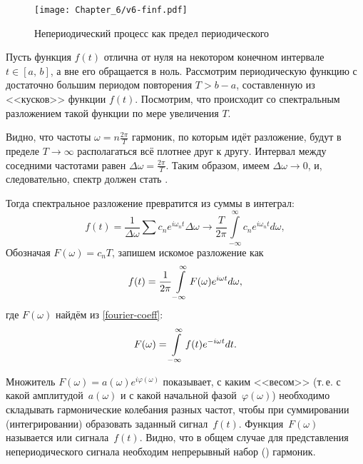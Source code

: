 \begin{wrapfigure}[9]{o}{0.5\textwidth}
    \centering\texttt{[image: Chapter\_6/v6-finf.pdf]}
    \caption{Непериодический процесс как предел периодического}
\end{wrapfigure}

Пусть функция $f(t)$ отлична от нуля на некотором конечном интервале
$t\in[a,\,b]$, а вне его обращается в ноль. Рассмотрим периодическую функцию
с достаточно большим периодом повторения $T>b-a$, составленную из <<кусков>>
функции $f(t)$. Посмотрим, что происходит со спектральным разложением
такой функции по мере увеличения $T$.

Видно, что частоты $\omega = n \frac{2\pi}{T}$ гармоник, по которым идёт
разложение, будут в пределе $T\to \infty$ располагаться всё плотнее друг к другу.
Интервал между соседними частотами равен $\Delta \omega = \frac{2\pi}{T}$.
Таким образом, имеем $\Delta \omega\to 0$, и, следовательно,
спектр должен стать .

Тогда спектральное разложение превратится из суммы в интеграл:
\begin{equation*}
 f(t) = \frac{1}{\Delta \omega}\sum c_n e^{i\omega_n t} \Delta \omega \to
 \frac{T}{2\pi} \int\limits_{-\infty}^{\infty} c_n e^{i\omega_n t} d\omega,
\end{equation*}
Обозначая $F(\omega)=c_n T$, запишем искомое разложение как
\begin{equation}
\eqmark{Fourier integral}
f(t) = \frac{1}{2\pi} \int\limits_{-\infty}^{\infty} F(\omega) e^{i\omega t} d\omega,
\end{equation}
где $F(\omega)$ найдём из \eqref{fourier-coeff}:
\begin{equation}
\eqmark{Fourier integral-coef}
 F(\omega) =
\int\limits_{-\infty}^{\infty} f(t) e^{-i\omega t} dt.
\end{equation}

Множитель $F(\omega)=a(\omega)e^{i\varphi(\omega)}$ показывает, с каким
<<весом>> (т.\,е. с какой амплитудой~$a(\omega)$ и с какой начальной 
фазой~$\varphi(\omega)$) необходимо складывать гармонические
колебания разных частот, чтобы при суммировании (интегрировании) образовать
заданный сигнал~$f(t)$. Функция~$F(\omega)$ называется 
или  сигнала~$f(t)$.
Видно, что в общем случае для представления
непериодического сигнала необходим непрерывный набор () гармоник.

